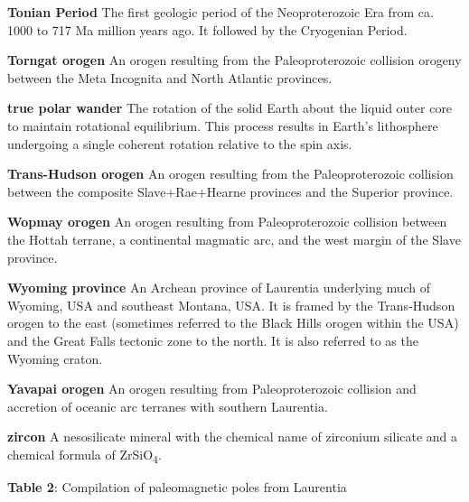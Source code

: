 \documentclass[twocolumn, switch]{article} %
\begin{document}
\noindent\textbf{Tonian Period } The first geologic period of the Neoproterozoic Era from ca. 1000 to 717 Ma million years ago. It followed by the Cryogenian Period.

\noindent\textbf{Torngat orogen } An orogen resulting from the Paleoproterozoic collision orogeny between the Meta Incognita and North Atlantic provinces.

\noindent\textbf{true polar wander } The rotation of the solid Earth about the liquid outer core to maintain rotational equilibrium. This process results in Earth's lithosphere undergoing a single coherent rotation relative to the spin axis.

\noindent\textbf{Trans-Hudson orogen } An orogen resulting from the Paleoproterozoic collision between the composite Slave+Rae+Hearne provinces and the Superior province.

\noindent\textbf{Wopmay orogen } An orogen resulting from Paleoproterozoic collision between the Hottah terrane, a continental magmatic arc, and the west margin of the Slave province.

\noindent\textbf{Wyoming province } An Archean province of Laurentia underlying much of Wyoming, USA and southeast Montana, USA. It is framed by the Trans-Hudson orogen to the east (sometimes referred to the Black Hills orogen within the USA) and the Great Falls tectonic zone to the north. It is also referred to as the Wyoming craton.

\noindent\textbf{Yavapai orogen } An orogen resulting from Paleoproterozoic collision and accretion of oceanic arc terranes with southern Laurentia.

\noindent\textbf{zircon } A nesosilicate mineral with the chemical name of zirconium silicate and a chemical formula of ZrSiO\textsubscript{4}.


\footnotesize

\newpage

{\scriptsize
\begin{landscape}
\textbf{Table 2}: Compilation of paleomagnetic poles from Laurentia

\end{landscape}
}


\end{document}
